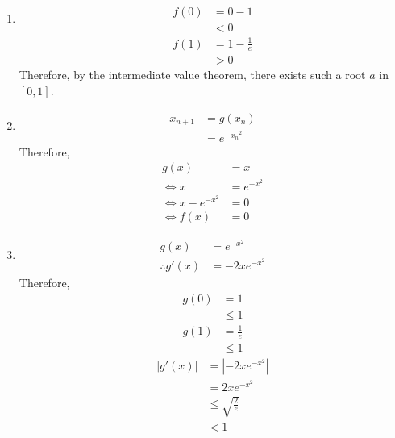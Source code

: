 \documentclass[fleqn, a4paper, 11pt, oneside]{amsart}
\theoremstyle{definition}
\theoremstyle{theorem}
\begin{document}
\begin{solution}
	\begin{enumerate}[leftmargin=*]
		\item
			\begin{align*}
				f(0) & = 0 - 1 \\
                                     & < 0
			\end{align*}
			\begin{align*}
				f(1) & = 1 - \frac{1}{e} \\
                                     & > 0
			\end{align*}
			Therefore, by the intermediate value theorem, there exists such a root $a$ in $[0,1]$.
		\item
			\begin{align*}
				x_{n + 1} & = g(x_n) \\
                                          & = e^{-{x_n}^2}
			\end{align*}
			Therefore,
			\begin{align*}
				g(x)              & = x        \\
				\iff x            & = e^{-x^2} \\
				\iff x - e^{-x^2} & = 0        \\
				\iff f(x)         & = 0
			\end{align*}
		\item
			\begin{align*}
				g(x)             & = e^{-x^2} \\
				\therefore g'(x) & = -2 x e^{-x^2}
			\end{align*}
			Therefore,
			\begin{align*}
				g(0) & = 1           \\
                                     & \le 1         \\
				g(1) & = \frac{1}{e} \\
                                     & \le 1
			\end{align*}
			\begin{align*}
				\left| g'(x) \right| & = \left| -2 x e^{-x^2} \right| \\
                                                     & = 2 x e^{-x^2}                 \\
                                                     & \le \sqrt{\frac{2}{e}}         \\
                                                     & < 1
			\end{align*}

\end{enumerate}
\end{solution}
\end{document}
